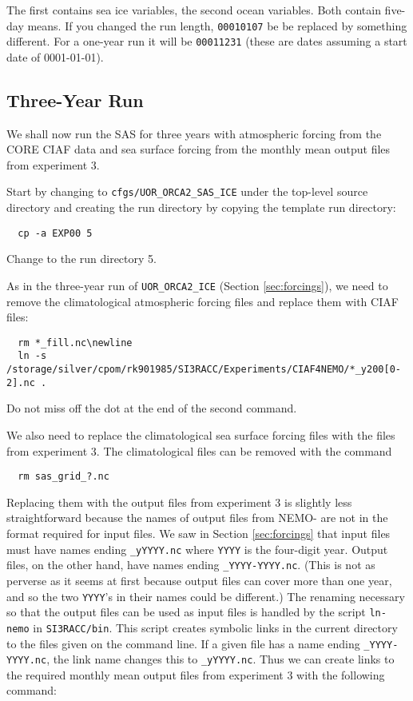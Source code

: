\noindent{}The first contains sea ice variables, the second ocean variables.
Both contain five-day means.
If you changed the run length, \verb|00010107| be be replaced by something different.
For a one-year run it will be \verb|00011231| (these are dates assuming a start date of 0001-01-01).


\subsection{Three-Year Run}
\label{sec:sas:subsec:3y-run}

We shall now run the SAS for three years with atmospheric forcing from the CORE CIAF data and sea surface forcing from the monthly mean output files from experiment 3.

Start by changing to \verb|cfgs/UOR_ORCA2_SAS_ICE| under the top-level source directory and creating the run directory by copying the template run directory:

\begin{verbatim}
  cp -a EXP00 5
\end{verbatim}

\noindent{}Change to the run directory 5.

As in the three-year run of \verb|UOR_ORCA2_ICE| (Section \ref{sec:forcings}), we need to remove the climatological atmospheric forcing files and replace them with CIAF files:

\begin{verbatim}
  rm *_fill.nc\newline
  ln -s /storage/silver/cpom/rk901985/SI3RACC/Experiments/CIAF4NEMO/*_y200[0-2].nc .
\end{verbatim}

\noindent{}Do not miss off the dot at the end of the second command.

We also need to replace the climatological sea surface forcing files with the files from experiment 3.
The climatological files can be removed with the command

\begin{verbatim}
  rm sas_grid_?.nc
\end{verbatim}

\noindent{}Replacing them with the output files from experiment 3 is slightly less straightforward because the names of output files from NEMO-\SIcu{} are not in the format required for input files.
We saw in Section \ref{sec:forcings} that input files must have names ending \verb|_yYYYY.nc| where \verb|YYYY| is the four-digit year.
Output files, on the other hand, have names ending \verb|_YYYY-YYYY.nc|.
(This is not as perverse as it seems at first because output files can cover more than one year, and so the two \verb|YYYY|'s in their names could be different.)
The renaming necessary so that the output files can be used as input files is handled by the script \verb|ln-nemo| in \verb|SI3RACC/bin|.
This script creates symbolic links in the current directory to the files given on the command line.
If a given file has a name ending \verb|_YYYY-YYYY.nc|, the link name changes this to \verb|_yYYYY.nc|.
Thus we can create links to the required monthly mean output files from experiment 3 with the following command:

